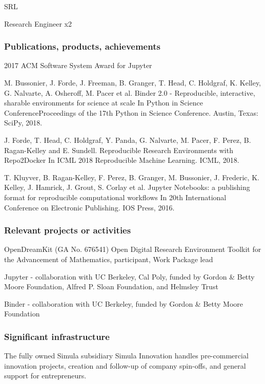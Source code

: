 \begin{sitedescription}{SRL}
\begin{participant}[PM=72, type=R]{Research Engineer x2}
\end{participant}


\subsubsection*{Publications, products, achievements}

\begin{compactenum}
\item 2017 ACM Software System Award for Jupyter
\item M. Bussonier, J. Forde, J. Freeman, B. Granger, T. Head, C. Holdgraf, K.
  Kelley, G. Nalvarte, A. Osheroff, M. Pacer et al. Binder 2.0 - Reproducible,
  interactive, sharable environments for science at scale In Python in Science
  ConferenceProceedings of the 17th Python in Science Conference. Austin,
  Texas: SciPy, 2018.
\item J. Forde, T. Head, C. Holdgraf, Y. Panda, G. Nalvarte, M. Pacer, F.
  Perez, B. Ragan-Kelley and E. Sundell. Reproducible Research Environments
  with Repo2Docker In ICML 2018 Reproducible Machine Learning. ICML, 2018.
\item T. Kluyver, B. Ragan-Kelley, F. Perez, B. Granger, M. Bussonier, J.
  Frederic, K. Kelley, J. Hamrick, J. Grout, S. Corlay et al. Jupyter
  Notebooks: a publishing format for reproducible computational workflows In
  20th International Conference on Electronic Publishing. IOS Press, 2016.

\end{compactenum}

\subsubsection*{Relevant projects or activities}

\begin{compactenum}
\item OpenDreamKit (GA No. 676541) Open Digital Research Environment Toolkit for the Advancement of Mathematics, participant, Work Package lead
\item Jupyter - collaboration with UC Berkeley, Cal Poly, funded by Gordon \&
  Betty Moore Foundation, Alfred P. Sloan Foundation, and Helmsley Trust
\item Binder - collaboration with UC Berkeley, funded by Gordon \& Betty Moore
  Foundation
\end{compactenum}

\subsubsection*{Significant infrastructure}

The fully owned Simula subsidiary Simula Innovation handles pre-commercial
innovation projects, creation and follow-up of company spin-offs, and general
support for entrepreneurs.

\end{sitedescription}



